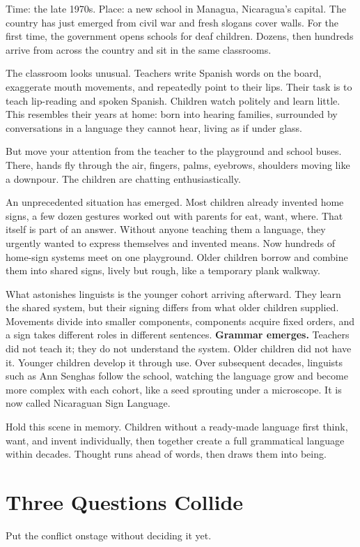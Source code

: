 Time: the late 1970s. Place: a new school in Managua, Nicaragua's capital. The country has just emerged from civil war and fresh slogans cover walls. For the first time, the government opens schools for deaf children. Dozens, then hundreds arrive from across the country and sit in the same classrooms.

The classroom looks unusual. Teachers write Spanish words on the board, exaggerate mouth movements, and repeatedly point to their lips. Their task is to teach lip-reading and spoken Spanish. Children watch politely and learn little. This resembles their years at home: born into hearing families, surrounded by conversations in a language they cannot hear, living as if under glass.

But move your attention from the teacher to the playground and school buses. There, hands fly through the air, fingers, palms, eyebrows, shoulders moving like a downpour. The children are chatting enthusiastically.

An unprecedented situation has emerged. Most children already invented home signs, a few dozen gestures worked out with parents for eat, want, where. That itself is part of an answer. Without anyone teaching them a language, they urgently wanted to express themselves and invented means. Now hundreds of home-sign systems meet on one playground. Older children borrow and combine them into shared signs, lively but rough, like a temporary plank walkway.

What astonishes linguists is the younger cohort arriving afterward. They learn the shared system, but their signing differs from what older children supplied. Movements divide into smaller components, components acquire fixed orders, and a sign takes different roles in different sentences. \textbf{Grammar emerges.} Teachers did not teach it; they do not understand the system. Older children did not have it. Younger children develop it through use. Over subsequent decades, linguists such as Ann Senghas follow the school, watching the language grow and become more complex with each cohort, like a seed sprouting under a microscope. It is now called Nicaraguan Sign Language.

Hold this scene in memory. Children without a ready-made language first think, want, and invent individually, then together create a full grammatical language within decades. Thought runs ahead of words, then draws them into being.

\section{Three Questions Collide}
Put the conflict onstage without deciding it yet.

